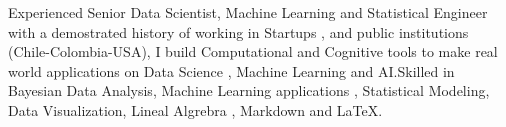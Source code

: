 

\begin{cvparagraph}

Experienced Senior Data Scientist, Machine Learning and Statistical Engineer with a demostrated history of working in Startups , and public institutions (Chile-Colombia-USA), I build Computational and Cognitive tools to make real world applications on Data Science , Machine Learning and AI.Skilled in Bayesian Data Analysis, Machine Learning applications , Statistical Modeling, Data Visualization, Lineal Algrebra , Markdown and LaTeX. 
\end{cvparagraph}

